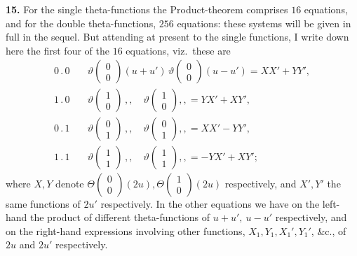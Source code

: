 \documentclass[11pt]{article}
\begin{document}
\textbf{15.} For the single theta-functions the Product-theorem comprises $16$ equations, and for the double theta-functions, $256$ equations: these systems will be given in full in the sequel. But attending at present to the single functions, I write down here the first four of the $16$ equations, viz.\ these are
\begin{align*}
0\mathbin{.}0\quad &\vartheta\!\begin{pmatrix} 0 \\ 0 \end{pmatrix}\!(u + u')\,\vartheta\!\begin{pmatrix} 0 \\ 0 \end{pmatrix}\!(u - u') = XX' + YY',\\
1\mathbin{.}0\quad &\vartheta\!\begin{pmatrix} 1 \\ 0 \end{pmatrix}\,,,\quad \vartheta\!\begin{pmatrix} 1 \\ 0 \end{pmatrix},, = YX' + XY',\\
0\mathbin{.}1\quad &\vartheta\!\begin{pmatrix} 0 \\ 1 \end{pmatrix}\,,,\quad \vartheta\!\begin{pmatrix} 0 \\ 1 \end{pmatrix},, = XX' - YY',\\
1\mathbin{.}1\quad &\vartheta\!\begin{pmatrix} 1 \\ 1 \end{pmatrix}\,,,\quad \vartheta\!\begin{pmatrix} 1 \\ 1 \end{pmatrix},, = -YX' + XY';
\end{align*}
where $X,Y$ denote $\Theta\!\begin{pmatrix} 0 \\ 0 \end{pmatrix}\!(2u), \Theta\!\begin{pmatrix} 1 \\ 0 \end{pmatrix}\!(2u)$ respectively, and $X',Y'$ the same functions of $2u'$ respectively. In the other equations we have on the left-hand the product of different theta-functions of $u + u',\ u - u'$ respectively, and on the right-hand expressions involving other functions, $X_1, Y_1, X_1', Y_1'$, \&c., of $2u$ and $2u'$ respectively.
\end{document}

